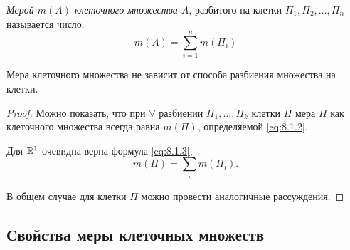 \begin{definition}
    \emph{Мерой $m(A)$ клеточного множества $A$}, разбитого на клетки $\Pi_1,\Pi_2,\ldots,\Pi_n$ называется число:
    \begin{equation}\label{eq:8.1.3}
        m(A) = \sum_{i=1}^{n}m(\Pi_i)
    \end{equation}
\end{definition}

\begin{lemma}
    Мера клеточного множества не зависит от способа разбиения множества на клетки.
\end{lemma}

\begin{proof}
    Можно показать, что при $\forall$ разбиении $\Pi_1,\ldots,\Pi_k$ клетки $\Pi$ мера $\Pi$ как клеточного множества всегда равна $m(\Pi)$, определяемой \ref{eq:8.1.2}.

    Для $\mathbb{R}^1$ очевидна верна формула \ref{eq:8.1.3},
    \[
        m(\Pi) = \underset{i}{\sum}m(\Pi_i).
    \]

    В общем случае для клетки $\Pi$ можно провести аналогичные рассуждения.
\end{proof}

\subsection{Свойства меры клеточных множеств}\label{subsec:8.1.3}

